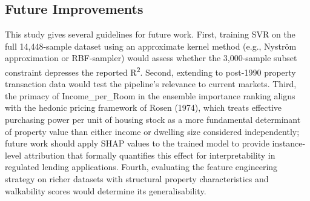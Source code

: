 \documentclass[pdflatex,sn-mathphys-num]{sn-jnl}
\begin{document}
\subsection{Future Improvements}
This study gives several guidelines for future work. First, training SVR on the full 14,448-sample dataset using an approximate kernel method (e.g., Nystr\"{o}m approximation or RBF-sampler) would assess whether the 3,000-sample subset constraint depresses the reported R\textsuperscript{2}. Second, extending to post-1990 property transaction data would test the pipeline's relevance to current markets. Third, the primacy of Income\_per\_Room in the ensemble importance ranking aligns with the hedonic pricing framework of Rosen (1974), which treats effective purchasing power per unit of housing stock as a more fundamental determinant of property value than either income or dwelling size considered independently; future work should apply SHAP values to the trained model to provide instance-level attribution that formally quantifies this effect for interpretability in regulated lending applications. Fourth, evaluating the feature engineering strategy on richer datasets with structural property characteristics and walkability scores would determine its generalisability.
\end{document}
